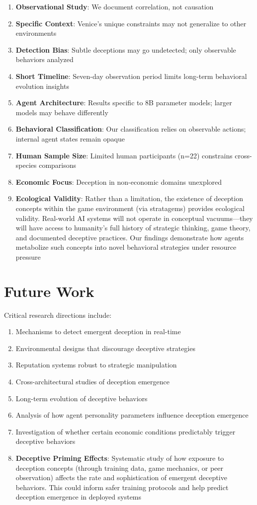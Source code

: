 \documentclass[10pt,twocolumn]{article}
\begin{document}
\begin{enumerate}
\item \textbf{Observational Study}: We document correlation, not causation
\item \textbf{Specific Context}: Venice's unique constraints may not generalize to other environments
\item \textbf{Detection Bias}: Subtle deceptions may go undetected; only observable behaviors analyzed
\item \textbf{Short Timeline}: Seven-day observation period limits long-term behavioral evolution insights
\item \textbf{Agent Architecture}: Results specific to 8B parameter models; larger models may behave differently
\item \textbf{Behavioral Classification}: Our classification relies on observable actions; internal agent states remain opaque
\item \textbf{Human Sample Size}: Limited human participants (n=22) constrains cross-species comparisons
\item \textbf{Economic Focus}: Deception in non-economic domains unexplored
\item \textbf{Ecological Validity}: Rather than a limitation, the existence of deception concepts within the game environment (via stratagems) provides ecological validity. Real-world AI systems will not operate in conceptual vacuums---they will have access to humanity's full history of strategic thinking, game theory, and documented deceptive practices. Our findings demonstrate how agents metabolize such concepts into novel behavioral strategies under resource pressure
\end{enumerate}

\section{Future Work}

Critical research directions include:
\begin{enumerate}
\item Mechanisms to detect emergent deception in real-time
\item Environmental designs that discourage deceptive strategies
\item Reputation systems robust to strategic manipulation
\item Cross-architectural studies of deception emergence
\item Long-term evolution of deceptive behaviors
\item Analysis of how agent personality parameters influence deception emergence
\item Investigation of whether certain economic conditions predictably trigger deceptive behaviors
\item \textbf{Deceptive Priming Effects}: Systematic study of how exposure to deception concepts (through training data, game mechanics, or peer observation) affects the rate and sophistication of emergent deceptive behaviors. This could inform safer training protocols and help predict deception emergence in deployed systems
\end{enumerate}
\end{document}
